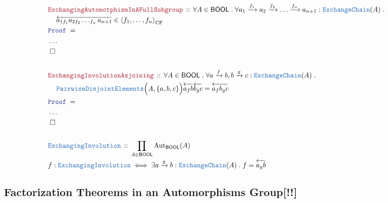 \documentclass[12pt]{scrartcl}
\newcommand{\TYPE}[1]{\textcolor{NavyBlue}{\mathtt{#1}}}
\newcommand{\LOGIC}[1]{\textcolor{Blue}{\mathtt{#1}}}
\newcommand{\THM}[1]{\textcolor{Maroon}{\mathtt{#1}}}
\renewcommand{\.}{\; . \;}
\newcommand{\Theorem}[2]{& \THM{#1} \, :: \, #2 \\ & \Proof = \\ }
\newcommand{\DeclareType}[2]{& \TYPE{#1} \, :: \, #2 \\}
\newcommand{\DefineType}[3]{& #1 : \TYPE{#2} \iff #3 \\}
\newcommand{\NewLine}{\\ & \kern 1pc}
\newcommand{\Page}[1]{ \begin{align*} #1 \end{align*}   }
\newcommand{\NoProof}{ & \ldots \\ \EndProof}
\newcommand{\Aut}{\mathrm{Aut}}
\newcommand{\Arrow}{\xrightarrow}
\newcommand{\QED}{\; \square}
\newcommand{\EndProof}{& \QED \\}
\newcommand{\Proof}{\LOGIC{Proof} \; }
\newcommand{\PD}{\TYPE{PairwiseDisjointElements}}
\newcommand{\genCFS}[1]{\left\langle #1 \right\rangle_\mathrm{CF}}
\newcommand{\BOOL}{\mathsf{BOOL}}
\begin{document}
\Page{
	\Theorem{ExchangingAutomotphismInAFullSubgroup}
	{		
		\forall A \in \BOOL \.
		\forall a_1 \Arrow{f_1} a_2 \Arrow{f_2} \ldots \Arrow{f_{n}} a_{n+1} 
		:\TYPE{ExchangeChain}(A) \.
		\NewLine
		\overleftarrow{a_{1 f_1} a_{2f_2} \ldots_{f_n}a_{n+1}} \in 
		\genCFS{f_1,\ldots,f_n}
	}
	\NoProof
	\\
	\Theorem{ExchangingInvolutionAsjoining}
	{
		\forall A \in \BOOL \.
		\forall a \Arrow{f} b,b \Arrow{g} c : \TYPE{ExchangeChain}(A) \. \NewLine 
		\PD\Big(A, \{a,b,c\} \Big)		
		\overleftarrow{a_f b}
		\overleftarrow{b_g c}  =
		\overleftarrow{a_f b_g c} 
	}
	\NoProof
	\\
	\DeclareType{ExchangingInvolution}
	{
		\prod_{A \in \BOOL} \Aut_\BOOL(A)
	}
	\DefineType{f}{ExchangingInvolution}
	{
		\exists a \Arrow{g} b : \TYPE{ExchangeChain}(A) \.
		f = \overleftarrow{a_g b}
	}
}
\newpage
\subsection{Factorization Theorems in an Automorphisms Group[!!]}
\end{document}
